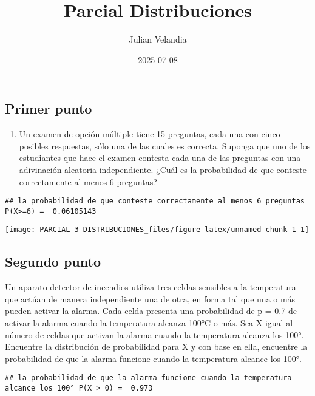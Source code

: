 \documentclass[
]{article}
\title{Parcial Distribuciones}
\author{Julian Velandia}
\date{2025-07-08}
\providecommand{\tightlist}{%
  \setlength{\itemsep}{0pt}\setlength{\parskip}{0pt}}
\begin{document}
\maketitle

\subsection{Primer punto}\label{primer-punto}

\begin{enumerate}
\def\labelenumi{\arabic{enumi}.}
\tightlist
\item
  Un examen de opción múltiple tiene 15 preguntas, cada una con cinco
  posibles respuestas, sólo una de las cuales es correcta. Suponga que
  uno de los estudiantes que hace el examen contesta cada una de las
  preguntas con una adivinación aleatoria independiente. ¿Cuál es la
  probabilidad de que conteste correctamente al menos 6 preguntas?
\end{enumerate}

\begin{verbatim}
## la probabilidad de que conteste correctamente al menos 6 preguntas P(X>=6) =  0.06105143
\end{verbatim}

\begin{center}\texttt{[image: PARCIAL-3-DISTRIBUCIONES\_files/figure-latex/unnamed-chunk-1-1]} \end{center}

\subsection{Segundo punto}\label{segundo-punto}

Un aparato detector de incendios utiliza tres celdas sensibles a la
temperatura que actúan de manera independiente una de otra, en forma tal
que una o más pueden activar la alarma. Cada celda presenta una
probabilidad de p = 0.7 de activar la alarma cuando la temperatura
alcanza 100°C o más. Sea X igual al número de celdas que activan la
alarma cuando la temperatura alcanza los 100°. Encuentre la distribución
de probabilidad para X y con base en ella, encuentre la probabilidad de
que la alarma funcione cuando la temperatura alcance los 100°.

\begin{verbatim}
## la probabilidad de que la alarma funcione cuando la temperatura alcance los 100° P(X > 0) =  0.973
\end{verbatim}
\end{document}
